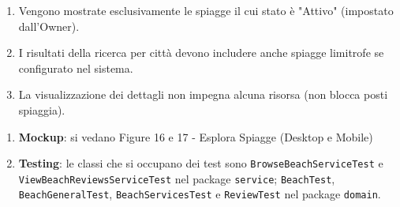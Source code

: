 \documentclass{article}
\begin{document}
	{
		\begin{enumerate}[nosep, leftmargin=*]
			\item[•] Vengono mostrate esclusivamente le spiagge il cui stato è "Attivo" (impostato dall'Owner).
			\item[•] I risultati della ricerca per città devono includere anche spiagge limitrofe se configurato nel sistema.
			\item[•] La visualizzazione dei dettagli non impegna alcuna risorsa (non blocca posti spiaggia).
		\end{enumerate}
		
		\begin{enumerate}[leftmargin=*]
			\item[•] \textbf{Mockup}: si vedano Figure 16 e 17 - Esplora Spiagge (Desktop e Mobile)
			
			\item[•] \textbf{Testing}: le classi che si occupano dei test sono \texttt{BrowseBeachServiceTest} e \texttt{ViewBeachReviewsServiceTest} nel package \texttt{service}; \texttt{BeachTest}, \texttt{BeachGeneralTest}, \texttt{BeachServicesTest} e \texttt{ReviewTest} nel package \texttt{domain}.
		\end{enumerate}
	}
		
	\newpage
	
\end{document}

